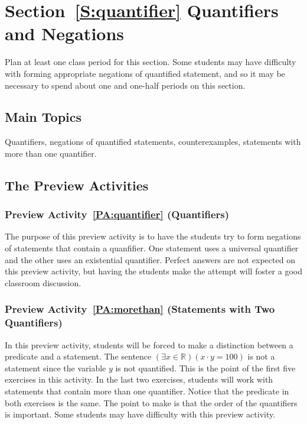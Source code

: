 \section*{Section~\ref{S:quantifier} Quantifiers and Negations}
Plan at least one class period for this section.  Some students may have difficulty with forming appropriate negations of quantified statement, and so it may be necessary to spend about one and one-half periods on this section.


\subsection*{Main Topics}
Quantifiers, negations of quantified statements, counterexamples, statements with more than one quantifier.

\subsection*{The Preview Activities}
\subsubsection*{Preview Activity~\ref{PA:quantifier} (Quantifiers)} 
The purpose of this preview activity is to have the students try to form negations of statements that contain a quanfifier.  One statement uses a universal quantifier and the other uses an existential quantifier.  Perfect answers are not expected on this preview activity, but having the students make the attempt will foster a good classroom discussion.

\subsubsection*{Preview Activity~\ref{PA:morethan} (Statements with Two Quantifiers)}  
In this preview activity, students will be forced to make a distinction between a predicate and a statement.  The sentence 
$\left( {\exists x \in \mathbb{R}} \right)\left( {x \cdot y = 100} \right)$ is not a statement since the variable $y$ is not quantified.  This is the point of the first five exercises in this activity.  In the last two exercises, students will work with statements that contain more than one quantifier.  Notice that the predicate in both exercises is the same.  The point to make is that the order of the quantifiers is important.  Some students may have difficulty with this preview activity.
\hbreak



